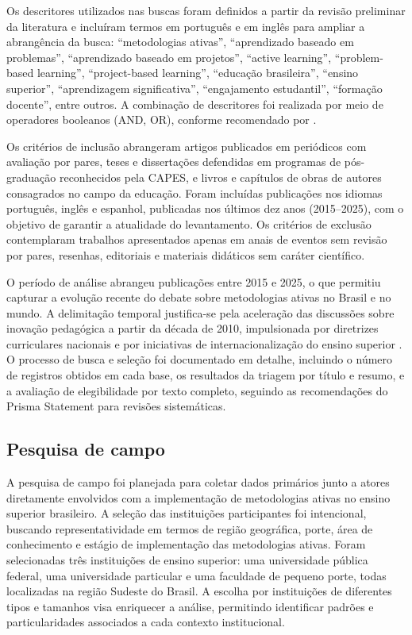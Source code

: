 Os descritores utilizados nas buscas foram definidos a partir da revisão preliminar da literatura e incluíram termos em português e em inglês para ampliar a abrangência da busca: ``metodologias ativas'', ``aprendizado baseado em problemas'', ``aprendizado baseado em projetos'', ``active learning'', ``problem-based learning'', ``project-based learning'', ``educação brasileira'', ``ensino superior'', ``aprendizagem significativa'', ``engajamento estudantil'', ``formação docente'', entre outros. A combinação de descritores foi realizada por meio de operadores booleanos (AND, OR), conforme recomendado por \cite{BARDIN2016}.

Os critérios de inclusão abrangeram artigos publicados em periódicos com avaliação por pares, teses e dissertações defendidas em programas de pós-graduação reconhecidos pela CAPES, e livros e capítulos de obras de autores consagrados no campo da educação. Foram incluídas publicações nos idiomas português, inglês e espanhol, publicadas nos últimos dez anos (2015--2025), com o objetivo de garantir a atualidade do levantamento. Os critérios de exclusão contemplaram trabalhos apresentados apenas em anais de eventos sem revisão por pares, resenhas, editoriais e materiais didáticos sem caráter científico.

O período de análise abrangeu publicações entre 2015 e 2025, o que permitiu capturar a evolução recente do debate sobre metodologias ativas no Brasil e no mundo. A delimitação temporal justifica-se pela aceleração das discussões sobre inovação pedagógica a partir da década de 2010, impulsionada por diretrizes curriculares nacionais e por iniciativas de internacionalização do ensino superior \cite{SANTOS2024}. O processo de busca e seleção foi documentado em detalhe, incluindo o número de registros obtidos em cada base, os resultados da triagem por título e resumo, e a avaliação de elegibilidade por texto completo, seguindo as recomendações do Prisma Statement para revisões sistemáticas.

\subsection{Pesquisa de campo}
\label{subsec:pesquisa_campo}

A pesquisa de campo foi planejada para coletar dados primários junto a atores diretamente envolvidos com a implementação de metodologias ativas no ensino superior brasileiro. A seleção das instituições participantes foi intencional, buscando representatividade em termos de região geográfica, porte, área de conhecimento e estágio de implementação das metodologias ativas. Foram selecionadas três instituições de ensino superior: uma universidade pública federal, uma universidade particular e uma faculdade de pequeno porte, todas localizadas na região Sudeste do Brasil. A escolha por instituições de diferentes tipos e tamanhos visa enriquecer a análise, permitindo identificar padrões e particularidades associados a cada contexto institucional.

